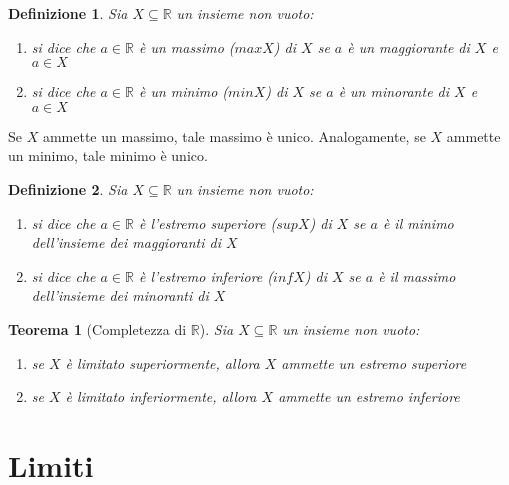 \documentclass[11pt]{book}
\newtheorem{theorem}{Teorema}[chapter]
\newtheorem{definition}{Definizione}[chapter]
\begin{document}
\begin{definition}
    Sia $X\subseteq\mathbb{R}$ un insieme non vuoto:
    \begin{enumerate}
        \item si dice che $a\in\mathbb{R}$ è un massimo ($maxX$) di $X$ se $a$ è un maggiorante di $X$ e $a\in X$
        \item si dice che $a\in\mathbb{R}$ è un minimo ($minX$) di $X$ se $a$ è un minorante di $X$ e $a\in X$
    \end{enumerate}
\end{definition}
Se $X$ ammette un massimo, tale massimo è unico. Analogamente, se $X$ ammette un minimo, tale minimo è unico.
\begin{definition}
    Sia $X\subseteq\mathbb{R}$ un insieme non vuoto:
    \begin{enumerate}
        \item si dice che $a\in\mathbb{R}$ è l'estremo superiore ($supX$) di $X$ se $a$ è il minimo dell'insieme dei maggioranti di 
        $X$
        \item si dice che $a\in\mathbb{R}$ è l'estremo inferiore ($infX$) di $X$ se $a$ è il massimo dell'insieme dei minoranti di 
        $X$
    \end{enumerate}
\end{definition}
\begin{theorem}[Completezza di $\mathbb{R}$]
    Sia $X\subseteq\mathbb{R}$ un insieme non vuoto:
    \begin{enumerate}
        \item se $X$ è limitato superiormente, allora $X$ ammette un estremo superiore
        \item se $X$ è limitato inferiormente, allora $X$ ammette un estremo inferiore
    \end{enumerate}
\end{theorem}
\chapter{Limiti}
\end{document}
